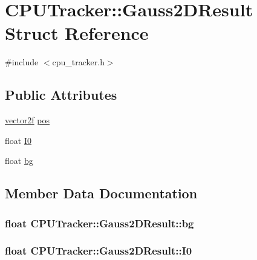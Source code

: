 \hypertarget{struct_c_p_u_tracker_1_1_gauss2_d_result}{}\section{C\+P\+U\+Tracker\+:\+:Gauss2\+D\+Result Struct Reference}
\label{struct_c_p_u_tracker_1_1_gauss2_d_result}


{\ttfamily \#include $<$cpu\+\_\+tracker.\+h$>$}

\subsection*{Public Attributes}
\begin{DoxyCompactItemize}
\item 
\hyperlink{std__incl_8h_aba974726076ec2d63a67114c536d123e}{vector2f} \hyperlink{struct_c_p_u_tracker_1_1_gauss2_d_result_a7b4664668842daa04882ca2dd1d91fce}{pos}
\item 
float \hyperlink{struct_c_p_u_tracker_1_1_gauss2_d_result_a0d28ea277cd7675a56bb8c4851bae2e7}{I0}
\item 
float \hyperlink{struct_c_p_u_tracker_1_1_gauss2_d_result_a296176805f852017c89642fc11dacbe9}{bg}
\end{DoxyCompactItemize}


\subsection{Member Data Documentation}
\subsubsection[{\texorpdfstring{bg}{bg}}]{\setlength{\rightskip}{0pt plus 5cm}float C\+P\+U\+Tracker\+::\+Gauss2\+D\+Result\+::bg}\hypertarget{struct_c_p_u_tracker_1_1_gauss2_d_result_a296176805f852017c89642fc11dacbe9}{}\label{struct_c_p_u_tracker_1_1_gauss2_d_result_a296176805f852017c89642fc11dacbe9}
\subsubsection[{\texorpdfstring{I0}{I0}}]{\setlength{\rightskip}{0pt plus 5cm}float C\+P\+U\+Tracker\+::\+Gauss2\+D\+Result\+::\+I0}\hypertarget{struct_c_p_u_tracker_1_1_gauss2_d_result_a0d28ea277cd7675a56bb8c4851bae2e7}{}\label{struct_c_p_u_tracker_1_1_gauss2_d_result_a0d28ea277cd7675a56bb8c4851bae2e7}
